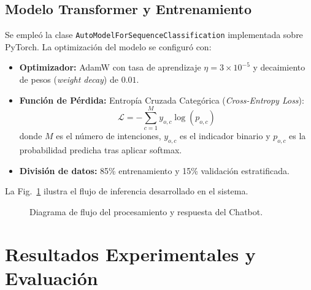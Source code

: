 \documentclass[conference]{IEEEtran}
\begin{document}
\subsection{Modelo Transformer y Entrenamiento}
Se empleó la clase \texttt{AutoModelForSequenceClassification} implementada sobre PyTorch. La optimización del modelo se configuró con:
\begin{itemize}
    \item \textbf{Optimizador:} AdamW \cite{loshchilov2018decoupled} con tasa de aprendizaje $\eta = 3 \times 10^{-5}$ y decaimiento de pesos (\textit{weight decay}) de $0.01$.
    \item \textbf{Función de Pérdida:} Entropía Cruzada Categórica (\textit{Cross-Entropy Loss}):
    \begin{equation}
    \mathcal{L} = -\sum_{c=1}^{M} y_{o,c} \log(p_{o,c})
    \end{equation}
    donde $M$ es el número de intenciones, $y_{o,c}$ es el indicador binario y $p_{o,c}$ es la probabilidad predicha tras aplicar softmax.
    \item \textbf{División de datos:} 85\% entrenamiento y 15\% validación estratificada.
\end{itemize}

La Fig.~\ref{fig:flujo} ilustra el flujo de inferencia desarrollado en el sistema.

\begin{figure}[htbp]
\centerline{}
\caption{Diagrama de flujo del procesamiento y respuesta del Chatbot.}
\label{fig:flujo}
\end{figure}

\section{Resultados Experimentales y Evaluación}
\end{document}
